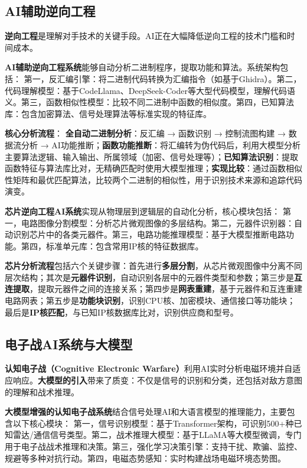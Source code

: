 \subsection{AI辅助逆向工程}

\textbf{逆向工程}是理解对手技术的关键手段。AI正在大幅降低逆向工程的技术门槛和时间成本。

\textbf{AI辅助逆向工程系统}能够自动分析二进制程序，提取功能和算法。系统架构包括：
第一，反汇编引擎：将二进制代码转换为汇编指令（如基于Ghidra）。第二，代码理解模型：基于CodeLlama、DeepSeek-Coder等大型代码模型，理解代码语义。第三，函数相似性模型：比较不同二进制中函数的相似度。第四，已知算法库：包含加密算法、信号处理算法等标准实现的特征库。

\textbf{核心分析流程}：
\textbf{全自动二进制分析}：反汇编 → 函数识别 → 控制流图构建 → 数据流分析 → AI功能推断；\textbf{函数功能推断}：将汇编转为伪代码后，利用大模型分析主要算法逻辑、输入输出、所属领域（加密、信号处理等）；\textbf{已知算法识别}：提取函数特征与算法库比对，无精确匹配时使用大模型推理；\textbf{实现比较}：通过函数相似性矩阵和最优匹配算法，比较两个二进制的相似性，用于识别技术来源和追踪代码演变。

\textbf{芯片逆向工程AI系统}实现从物理层到逻辑层的自动化分析，核心模块包括：
第一，电路图像分割模型：分析芯片微观图像的多层结构。第二，元器件识别器：自动识别芯片中的各类元器件。第三，电路功能推理模型：基于大模型推断电路功能。第四，标准单元库：包含常用IP核的特征数据库。

\textbf{芯片分析流程}包括六个关键步骤：首先进行\textbf{多层分割}，从芯片微观图像中分离不同层次结构；其次是\textbf{元器件识别}，自动识别各层中的元器件类型和参数；第三步是\textbf{互连提取}，提取元器件之间的连接关系；第四步是\textbf{网表重建}，基于元器件和互连重建电路网表；第五步是\textbf{功能块识别}，识别CPU核、加密模块、通信接口等功能块；最后是\textbf{IP核匹配}，与已知IP核数据库比对，识别供应商和型号。

\subsection{电子战AI系统与大模型}

\textbf{认知电子战（Cognitive Electronic Warfare）}利用AI实时分析电磁环境并自适应响应。\textbf{大模型的引入}带来了质变：不仅是信号的识别和分类，还包括对敌方意图的理解和战术推理。

\textbf{大模型增强的认知电子战系统}结合信号处理AI和大语言模型的推理能力，主要包含以下核心模块：
第一，信号识别模型：基于Transformer架构，可识别500+种已知雷达/通信信号类型。第二，战术推理大模型：基于LLaMA等大模型微调，专门用于电子战战术推理和决策。第三，强化学习决策引擎：支持干扰、欺骗、监控、规避等多种对抗行动。第四，电磁态势感知：实时构建战场电磁环境态势图。


